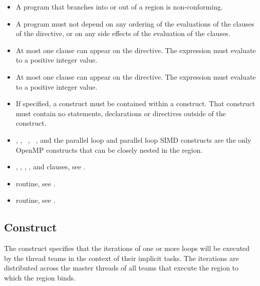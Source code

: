 \begin{itemize}
\item A program that branches into or out of a  region is non-conforming.

\item A program must not depend on any ordering of the evaluations of the clauses of the 
 directive, or on any side effects of the evaluation of the clauses.

\item At most one  clause can appear on the directive. The 
 expression must evaluate to a positive integer value.

\item At most one  clause can appear on the directive. The 
expression must evaluate to a positive integer value.

\item If specified, a  construct must be contained within a  construct. That  construct must contain no statements, declarations or directives outside of the  construct.

\item {}, , ~, ~, 
and the parallel loop and parallel loop SIMD constructs are the only OpenMP 
constructs that can be closely nested in the  region. 
\end{itemize}

\crossreferences
\begin{itemize}

\item {}, , , , and  clauses, see 
.

\item {} routine, see 
.

\item {} routine, see 
.
\end{itemize}









\subsection{ Construct}
\label{subsec:distribute Construct}
\summary
The  construct specifies that the iterations of one or more loops will be 
executed by the thread teams in the context of their implicit tasks. The iterations are 
distributed across the master threads of all teams that execute the  region to 
which the  region binds.

